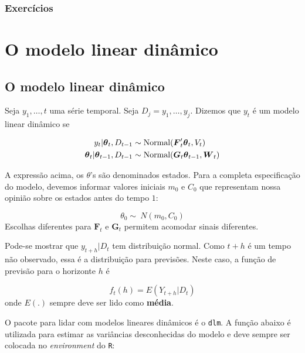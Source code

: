 \documentclass[
  letterpaper,
  DIV=11,
  numbers=noendperiod]{scrreprt}
\begin{document}
\hypertarget{exercuxedcios-3}{%
\subsection{Exercícios}\label{exercuxedcios-3}}


\hypertarget{o-modelo-linear-dinuxe2mico}{%
\chapter{O modelo linear dinâmico}\label{o-modelo-linear-dinuxe2mico}}

\hypertarget{o-modelo-linear-dinuxe2mico-1}{%
\section{O modelo linear dinâmico}\label{o-modelo-linear-dinuxe2mico-1}}

Seja \(y_1,\ldots,t\) uma série temporal. Seja \(D_j={y_1,\ldots,y_j}\).
Dizemos que \(y_t\) é um modelo linear dinâmico se

\[\begin{align}
y_t|\boldsymbol{\theta}_t,D_{t-1}&\sim\hbox{Normal}(\boldsymbol{F}_t'\boldsymbol{\theta}_t,V_t)\\
\boldsymbol{\theta}_t|\boldsymbol{\theta}_{t-1},D_{t-1}&\sim\hbox{Normal}(\boldsymbol{G}_t\boldsymbol{\theta}_{t-1},\boldsymbol{W}_t)
\end{align}\]

A expressão acima, os \(\theta\)'s são denominados estados. Para a
completa especificação do modelo, devemos informar valores iniciais
\(m_0\) e \(C_0\) que representam nossa opinião sobre os estados antes
do tempo \(1\):

\[\theta_0\sim\ N(m_0,C_0)\] Escolhas diferentes para
\(\boldsymbol{F}_t\) e \(\boldsymbol{G}_t\) permitem acomodar sinais
diferentes.

Pode-se mostrar que \(y_{t+h}|D_t\) tem distribuição normal. Como
\(t+h\) é um tempo não observado, essa é a distribuição para previsões.
Neste caso, a função de previsão para o horizonte \(h\) é

\[f_t(h)=E(Y_{t+h}|D_{t})\] onde \(E(.)\) sempre deve ser lido como
\textbf{média}.

O pacote para lidar com modelos lineares dinâmicos é o \texttt{dlm}. A
função abaixo é utilizada para estimar as variâncias desconhecidas do
modelo e deve sempre ser colocada no \emph{environment} do \texttt{R}:
\end{document}
